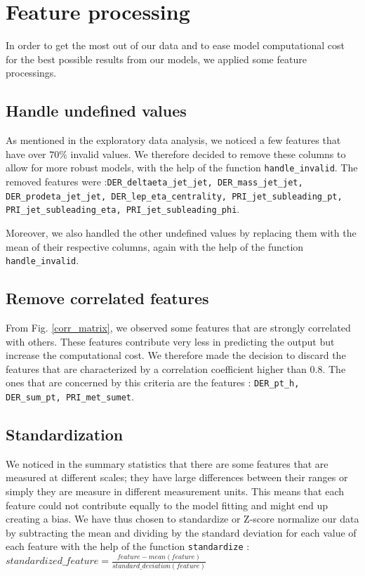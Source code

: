 \documentclass[10pt,conference,compsocconf]{IEEEtran}
\begin{document}
\section{Feature processing}
In order to get the most out of our data and to ease model computational cost for the best possible results from our models, we applied some feature processings.

\subsection{Handle undefined values}
As mentioned in the exploratory data analysis, we noticed a few features that have over $70\%$ invalid values. We therefore decided to remove these columns to allow for more robust models, with the help of the function \texttt{handle\_invalid}. The removed features were :\texttt{DER\_deltaeta\_jet\_jet, DER\_mass\_jet\_jet, DER\_prodeta\_jet\_jet, DER\_lep\_eta\_centrality, PRI\_jet\_subleading\_pt, PRI\_jet\_subleading\_eta, PRI\_jet\_subleading\_phi}.

Moreover, we also handled the other undefined values by replacing them with the mean of their respective columns, again with the help of the function \texttt{handle\_invalid}.

\subsection{Remove correlated features}
From Fig. \ref{corr_matrix}, we observed some features that are strongly correlated with others. These features contribute very less in predicting the output but increase the computational cost. We therefore made the decision to discard the features that are characterized by a correlation coefficient higher than 0.8. The ones that are concerned by this criteria are the features : \texttt{DER\_pt\_h, DER\_sum\_pt, PRI\_met\_sumet}.

\subsection{Standardization}
We noticed in the summary statistics that there are some features that are measured at different scales; they have large differences between their ranges or simply they are measure in different measurement units. This means that each feature could not contribute equally to the model fitting and might end up creating a bias. We have thus chosen to standardize or Z-score normalize our data by subtracting the mean and dividing by the standard deviation for each value of each feature with the help of the function \texttt{standardize} : $standardized\_feature = \frac{feature - mean(feature)}{standard\_deviation(feature)}$
\end{document}
